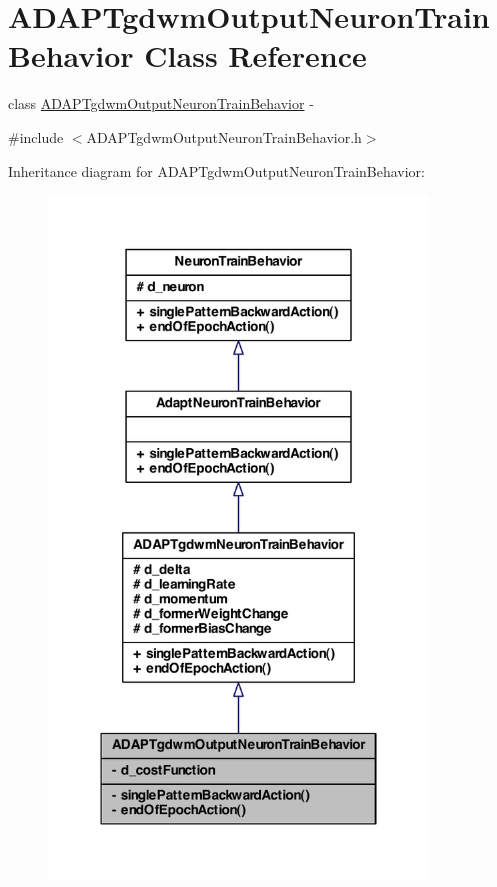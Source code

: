 \hypertarget{class_a_d_a_p_tgdwm_output_neuron_train_behavior}{
\section{ADAPTgdwmOutputNeuronTrainBehavior Class Reference}
\label{class_a_d_a_p_tgdwm_output_neuron_train_behavior}
}


class \hyperlink{class_a_d_a_p_tgdwm_output_neuron_train_behavior}{ADAPTgdwmOutputNeuronTrainBehavior} -\/  




{\ttfamily \#include $<$ADAPTgdwmOutputNeuronTrainBehavior.h$>$}



Inheritance diagram for ADAPTgdwmOutputNeuronTrainBehavior:
\nopagebreak
\begin{figure}[H]
\begin{center}
\leavevmode
\includegraphics[width=286pt]{class_a_d_a_p_tgdwm_output_neuron_train_behavior__inherit__graph}
\end{center}
\end{figure}


